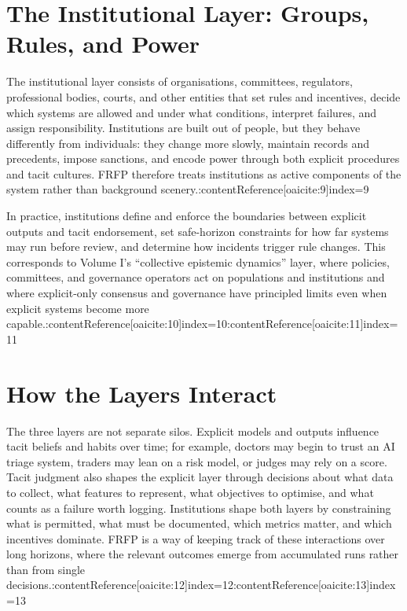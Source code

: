 \section{The Institutional Layer: Groups, Rules, and Power}

The institutional layer consists of organisations, committees, regulators, professional bodies, courts, and other entities that set rules and incentives, decide which systems are allowed and under what conditions, interpret failures, and assign responsibility. Institutions are built out of people, but they behave differently from individuals: they change more slowly, maintain records and precedents, impose sanctions, and encode power through both explicit procedures and tacit cultures. FRFP therefore treats institutions as active components of the system rather than background scenery.:contentReference[oaicite:9]{index=9}

In practice, institutions define and enforce the boundaries between explicit outputs and tacit endorsement, set safe-horizon constraints for how far systems may run before review, and determine how incidents trigger rule changes. This corresponds to Volume I’s ``collective epistemic dynamics'' layer, where policies, committees, and governance operators act on populations and institutions and where explicit-only consensus and governance have principled limits even when explicit systems become more capable.:contentReference[oaicite:10]{index=10}:contentReference[oaicite:11]{index=11}

\section{How the Layers Interact}

The three layers are not separate silos. Explicit models and outputs influence tacit beliefs and habits over time; for example, doctors may begin to trust an AI triage system, traders may lean on a risk model, or judges may rely on a score. Tacit judgment also shapes the explicit layer through decisions about what data to collect, what features to represent, what objectives to optimise, and what counts as a failure worth logging. Institutions shape both layers by constraining what is permitted, what must be documented, which metrics matter, and which incentives dominate. FRFP is a way of keeping track of these interactions over long horizons, where the relevant outcomes emerge from accumulated runs rather than from single decisions.:contentReference[oaicite:12]{index=12}:contentReference[oaicite:13]{index=13}


